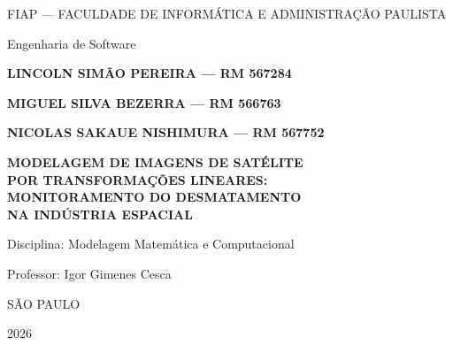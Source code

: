 \documentclass[12pt,a4paper,oneside]{article}
\begin{document}
\begin{titlepage}
\centering
{\large FIAP — FACULDADE DE INFORMÁTICA E ADMINISTRAÇÃO PAULISTA\par}
\vspace{0.4cm}
{\normalsize Engenharia de Software\par}
\vspace{3.5cm}

{\large\bfseries LINCOLN SIMÃO PEREIRA — RM 567284\par}
{\large\bfseries MIGUEL SILVA BEZERRA — RM 566763\par}
{\large\bfseries NICOLAS SAKAUE NISHIMURA — RM 567752\par}

\vspace{3.5cm}
{\LARGE\bfseries MODELAGEM DE IMAGENS DE SATÉLITE\\[0.25cm]
POR TRANSFORMAÇÕES LINEARES:\\[0.25cm]
MONITORAMENTO DO DESMATAMENTO\\[0.25cm]
NA INDÚSTRIA ESPACIAL\par}

\vfill
{\normalsize Disciplina: Modelagem Matemática e Computacional\par}
{\normalsize Professor: Igor Gimenes Cesca\par}
\vspace{1.5cm}
{\normalsize SÃO PAULO\par}
{\normalsize 2026\par}
\end{titlepage}
\end{document}
